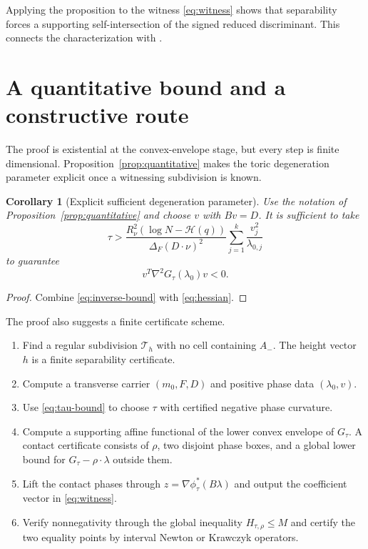 \documentclass[11pt]{article}
\theoremstyle{plain}
\newtheorem{corollary}[theorem]{Corollary}
\theoremstyle{definition}
\theoremstyle{remark}
\begin{document}
Applying the proposition to the witness \eqref{eq:witness} shows that separability forces a supporting self-intersection of the signed reduced discriminant. This connects the characterization with \cite{ForsgardDeWolff,DengRojasTelek}.

\section{A quantitative bound and a constructive route}

The proof is existential at the convex-envelope stage, but every step is finite dimensional. Proposition~\ref{prop:quantitative} makes the toric degeneration parameter explicit once a witnessing subdivision is known.

\begin{corollary}[Explicit sufficient degeneration parameter]\label{cor:tau-bound}
Use the notation of Proposition~\ref{prop:quantitative} and choose $v$ with $Bv=D$. It is sufficient to take
\begin{equation}\label{eq:tau-bound}
 \tau>
 \frac{R_\nu^2(\log N-\mathcal H(q))}
 {\Delta_F(D\cdot\nu)^2}
 \sum_{j=1}^k\frac{v_j^2}{\lambda_{0,j}}
\end{equation}
to guarantee
\[
 v^T\nabla^2G_\tau(\lambda_0)v<0.
\]
\end{corollary}

\begin{proof}
Combine \eqref{eq:inverse-bound} with \eqref{eq:hessian}.
\end{proof}

The proof also suggests a finite certificate scheme.
\begin{enumerate}[label=\textbf{Step \arabic*.}]
\item Find a regular subdivision $\mathcal T_h$ with no cell containing $A_-$. The height vector $h$ is a finite separability certificate.
\item Compute a transverse carrier $(m_0,F,D)$ and positive phase data $(\lambda_0,v)$.
\item Use \eqref{eq:tau-bound} to choose $\tau$ with certified negative phase curvature.
\item Compute a supporting affine functional of the lower convex envelope of $G_\tau$. A contact certificate consists of $\rho$, two disjoint phase boxes, and a global lower bound for $G_\tau-\rho\cdot\lambda$ outside them.
\item Lift the contact phases through $z=\nabla\phi_\tau^*(B\lambda)$ and output the coefficient vector in \eqref{eq:witness}.
\item Verify nonnegativity through the global inequality $H_{\tau,\rho}\le M$ and certify the two equality points by interval Newton or Krawczyk operators.
\end{enumerate}
\end{document}
